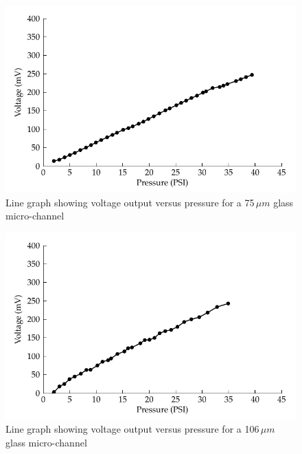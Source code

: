 \begin{figure}
\begin{centering}
\includegraphics{content/appendices/streamingCellMeasurements/graphics/streamingCell_voltVsPress_75um_out}
\par\end{centering}

\protect\caption{Line graph showing voltage output versus pressure for a 75$\,\mu m$
glass micro-channel}
\end{figure}
\begin{figure}
\begin{centering}
\includegraphics{content/appendices/streamingCellMeasurements/graphics/streamingCell_voltVsPress_106um_out}
\par\end{centering}

\protect\caption{Line graph showing voltage output versus pressure for a 106$\,\mu m$
glass micro-channel}
\end{figure}
